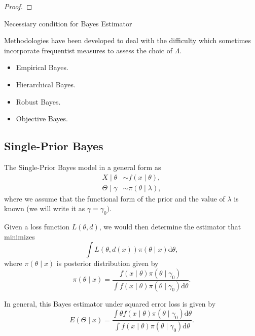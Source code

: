 \begin{proof}

\end{proof}

\begin{theorem}
	Necessiary condition for Bayes Estimator
\end{theorem}

Methodologies have been developed to deal with the difficulty which sometimes incorporate frequentist measures to assess the choic of $\Lambda$.

\begin{itemize}
	\item Empirical Bayes.
	\item Hierarchical Bayes.
	\item Robust Bayes.
	\item Objective Bayes.
\end{itemize}

\subsection{Single-Prior Bayes}

The Single-Prior Bayes model in a general form as
\begin{equation}
	\begin{aligned}
		X\mid\theta      & \sim f\left(x\mid\theta\right),         \\
		\Theta\mid\gamma & \sim \pi\left(\theta\mid\lambda\right),
	\end{aligned}
	\label{eq:single-prior-bayes}
\end{equation}
where we assume that the functional form of the prior and the value of $\lambda$ is known (we will write it as $\gamma=\gamma_0)$.

Given a loss function $L\left(\theta,d\right)$, we would then determine the estimator that minimizes
\begin{equation}
	\int L\left(\theta,d\left(x\right)\right)\pi\left(\theta\mid x\right)\mathrm{d}\theta,
\end{equation}
where $\pi\left(\theta\mid x\right)$ is posterior distribution given by
\begin{equation*}
	\pi\left(\theta\mid x\right)=\frac{f\left(x\mid\theta\right)\pi\left(\theta\mid\gamma_0\right)}{\int f\left(x\mid\theta\right)\pi\left(\theta\mid\gamma_0\right)\mathrm{d}\theta}.
\end{equation*}

In general, this Bayes estimator under squared error loss is given by
\begin{equation}
	E\left(\Theta\mid x\right) = \frac{\int\theta f\left(x\mid\theta\right)\pi\left(\theta\mid\gamma_0\right)\mathrm{d}\theta}{\int f\left(x\mid\theta\right)\pi\left(\theta\mid\gamma_0\right)\mathrm{d}\theta}.
\end{equation}

